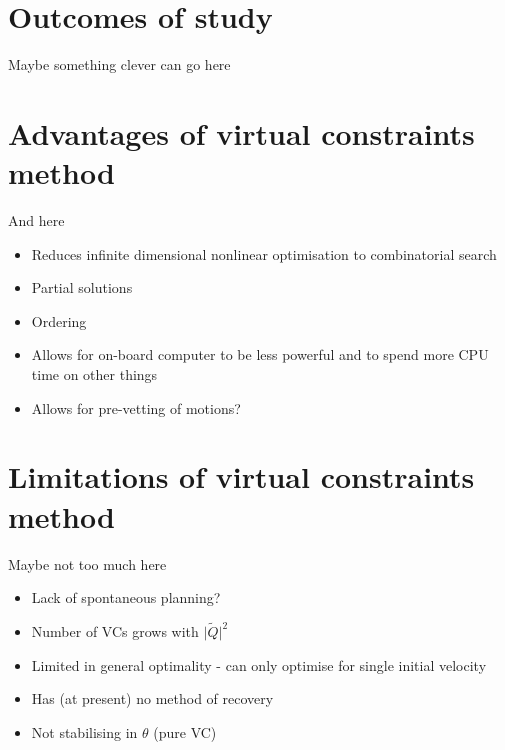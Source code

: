 \section{Outcomes of study}
Maybe something clever can go here

\section{Advantages of virtual constraints method}
And here
\begin{itemize}
	\item Reduces infinite dimensional nonlinear optimisation to combinatorial search
	\item Partial solutions
	\item Ordering
	\item Allows for on-board computer to be less powerful and to spend more CPU time on other things
	\item Allows for pre-vetting of motions?
\end{itemize}

\section{Limitations of virtual constraints method}
Maybe not too much here
\begin{itemize}
	\item Lack of spontaneous planning?
	\item Number of VCs grows with $\lvert\tilde{Q}\rvert^2$
	\item Limited in general optimality - can only optimise for single initial velocity
	\item Has (at present) no method of recovery
	\item Not stabilising in $\theta$ (pure VC)
\end{itemize}